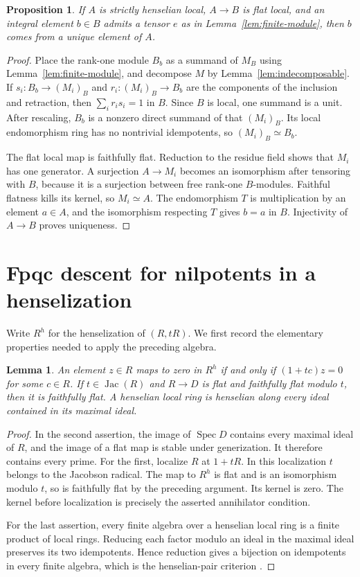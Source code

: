 \documentclass[11pt]{article}
\newtheorem{proposition}[theorem]{Proposition}
\newtheorem{lemma}[theorem]{Lemma}
\theoremstyle{definition}\newtheorem{definition}[theorem]{Definition}
\theoremstyle{remark}\newtheorem{remark}[theorem]{Remark}
\newcommand{\Spec}{\operatorname{Spec}}
\newcommand{\Jac}{\operatorname{Jac}}
\begin{document}
\begin{proposition}\label{prop:integral-descent}
If $A$ is strictly henselian local, $A\to B$ is flat local, and an integral element $b\in B$ admits a tensor $e$ as in Lemma~\ref{lem:finite-module}, then $b$ comes from a unique element of $A$.
\end{proposition}
\begin{proof}
Place the rank-one module $B_b$ as a summand of $M_B$ using Lemma~\ref{lem:finite-module}, and decompose $M$ by Lemma~\ref{lem:indecomposable}. If $s_i:B_b\to(M_i)_B$ and $r_i:(M_i)_B\to B_b$ are the components of the inclusion and retraction, then $\sum_i r_is_i=1$ in $B$. Since $B$ is local, one summand is a unit. After rescaling, $B_b$ is a nonzero direct summand of that $(M_i)_B$. Its local endomorphism ring has no nontrivial idempotents, so $(M_i)_B\simeq B_b$.

The flat local map is faithfully flat. Reduction to the residue field shows that $M_i$ has one generator. A surjection $A\to M_i$ becomes an isomorphism after tensoring with $B$, because it is a surjection between free rank-one $B$-modules. Faithful flatness kills its kernel, so $M_i\simeq A$. The endomorphism $T$ is multiplication by an element $a\in A$, and the isomorphism respecting $T$ gives $b=a$ in $B$. Injectivity of $A\to B$ proves uniqueness.
\end{proof}

\section{Fpqc descent for nilpotents in a henselization}\label{sec:descent}

Write $R^h$ for the henselization of $(R,tR)$. We first record the elementary properties needed to apply the preceding algebra.

\begin{lemma}\label{lem:hensel}
An element $z\in R$ maps to zero in $R^h$ if and only if $(1+tc)z=0$ for some $c\in R$. If $t\in\Jac(R)$ and $R\to D$ is flat and faithfully flat modulo $t$, then it is faithfully flat. A henselian local ring is henselian along every ideal contained in its maximal ideal.
\end{lemma}
\begin{proof}
In the second assertion, the image of $\Spec D$ contains every maximal ideal of $R$, and the image of a flat map is stable under generization. It therefore contains every prime. For the first, localize $R$ at $1+tR$. In this localization $t$ belongs to the Jacobson radical. The map to $R^h$ is flat and is an isomorphism modulo $t$, so is faithfully flat by the preceding argument. Its kernel is zero. The kernel before localization is precisely the asserted annihilator condition.

For the last assertion, every finite algebra over a henselian local ring is a finite product of local rings. Reducing each factor modulo an ideal in the maximal ideal preserves its two idempotents. Hence reduction gives a bijection on idempotents in every finite algebra, which is the henselian-pair criterion \cite[Tags 04GG, 09XI]{Stacks}.
\end{proof}
\end{document}
